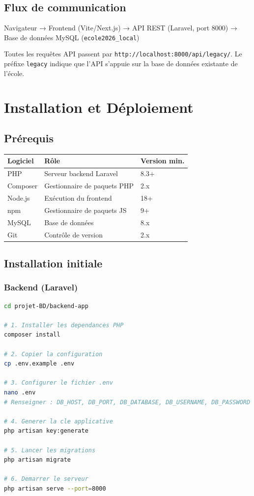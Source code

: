 \documentclass[12pt,a4paper]{report}
\begin{document}
\section{Flux de communication}

\begin{infobox}
Navigateur → Frontend (Vite/Next.js) → API REST (Laravel, port 8000) → Base de données MySQL (\texttt{ecole2026\_local})
\end{infobox}

Toutes les requêtes API passent par \texttt{http://localhost:8000/api/legacy/}. Le préfixe \texttt{legacy} indique que l'API s'appuie sur la base de données existante de l'école.

\chapter{Installation et Déploiement}

\section{Prérequis}

\begin{tabularx}{\textwidth}{lXl}\toprule
\textbf{Logiciel} & \textbf{Rôle} & \textbf{Version min.} \\\midrule
PHP & Serveur backend Laravel & 8.3+ \\
Composer & Gestionnaire de paquets PHP & 2.x \\
Node.js & Exécution du frontend & 18+ \\
npm & Gestionnaire de paquets JS & 9+ \\
MySQL & Base de données & 8.x \\
Git & Contrôle de version & 2.x \\
\bottomrule\end{tabularx}

\section{Installation initiale}

\subsection{Backend (Laravel)}
\begin{lstlisting}[language=bash]
cd projet-BD/backend-app

# 1. Installer les dependances PHP
composer install

# 2. Copier la configuration
cp .env.example .env

# 3. Configurer le fichier .env
nano .env
# Renseigner : DB_HOST, DB_PORT, DB_DATABASE, DB_USERNAME, DB_PASSWORD

# 4. Generer la cle applicative
php artisan key:generate

# 5. Lancer les migrations
php artisan migrate

# 6. Demarrer le serveur
php artisan serve --port=8000
\end{lstlisting}
\end{document}
